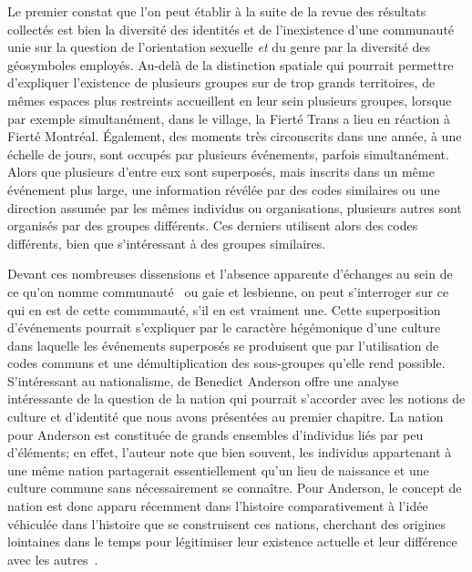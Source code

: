 Le premier constat que l'on peut établir à la suite de la revue des résultats collectés est bien la diversité des identités \lgbt{} et de l'inexistence d'une communauté unie sur la question de l'orientation sexuelle \emph{et} du genre par la diversité des géosymboles employés.
Au-delà de la distinction spatiale qui pourrait permettre d'expliquer l'existence de plusieurs groupes sur de trop grands territoires, de mêmes espaces plus restreints accueillent en leur sein plusieurs groupes, lorsque par exemple simultanément, dans le village, la Fierté Trans a lieu en réaction à Fierté Montréal.
Également, des moments très circonscrits dans une année, à une échelle de jours, sont occupés par plusieurs événements, parfois simultanément.
Alors que plusieurs d'entre eux sont superposés, mais inscrits dans un même événement plus large, une information révélée par des codes similaires ou une direction assumée par les mêmes individus ou organisations, plusieurs autres sont organisés par des groupes différents. 
Ces derniers utilisent alors des codes différents, bien que s'intéressant à des groupes similaires.

Devant ces nombreuses dissensions et l'absence apparente d'échanges au sein de ce qu'on nomme communauté~\lgbt{} ou gaie et lesbienne, on peut s'interroger sur ce qui en est de cette communauté, s'il en est vraiment une.
Cette superposition d'événements pourrait s'expliquer par le caractère hégémonique d'une culture~\lgbt{} dans  laquelle les événements superposés se produisent que par l'utilisation de codes communs et une démultiplication des sous-groupes qu'elle rend possible.
S'intéressant au nationalisme,  de Benedict Anderson offre une analyse intéressante de la question de la nation qui pourrait s'accorder avec les notions de culture et d'identité que nous avons présentées au premier chapitre.
La nation pour Anderson est constituée de grands ensembles d'individus liés par peu d'éléments; en effet, l'auteur note que bien souvent, les individus appartenant à une même nation partagerait essentiellement qu'un lieu de naissance et une culture commune sans nécessairement se connaître.
Pour Anderson, le concept de nation est donc apparu récemment dans l'histoire comparativement à l'idée véhiculée dans l'histoire que se construisent ces nations, cherchant des origines lointaines dans le temps pour légitimiser leur existence actuelle et leur différence avec les autres~\citep[27]{Anderson2006}.

